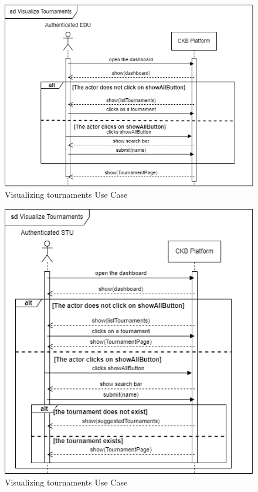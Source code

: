     \begin{figure}[H]
        \centering
        \includegraphics[width=1\textwidth]{images/sequence_diagrams/ClassDiagram-UC15.1-SequenceDiagram.png}
        \caption{Visualizing tournaments Use Case}
        \label{fig:uc15.1}
    \end{figure}
    \begin{figure}[H]
        \centering
        \includegraphics[width=1\textwidth]{images/sequence_diagrams/ClassDiagram-UC15.2-SequenceDiagram.png}
        \caption{Visualizing tournaments Use Case}
        \label{fig:uc15.2}
    \end{figure}
